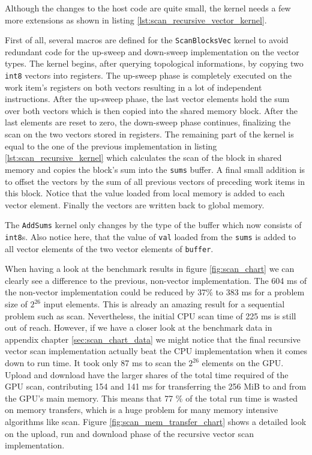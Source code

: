 Although the changes to the host code are quite small, the kernel needs a few more extensions as shown in listing \ref{lst:scan_recursive_vector_kernel}.



First of all, several macros are defined for the \lstinline!ScanBlocksVec! kernel to avoid redundant code for the up-sweep and down-sweep implementation on the vector types. The kernel begins, after querying topological informations, by copying two \lstinline!int8! vectors into registers. The up-sweep phase is completely executed on the work item's registers on both vectors resulting in a lot of independent instructions. After the up-sweep phase, the last vector elements hold the sum over both vectors which is then copied into the shared memory block. After the last elements are reset to zero, the down-sweep phase continues, finalizing the scan on the two vectors stored in registers. The remaining part of the kernel is equal to the one of the previous implementation in listing \ref{lst:scan_recursive_kernel} which calculates the scan of the block in shared memory and copies the block's sum into the \lstinline!sums! buffer. A final small addition is to offset the vectors by the sum of all previous vectors of preceding work items in this block. Notice that the value loaded from local memory is added to each vector element. Finally the vectors are written back to global memory.

The \lstinline!AddSums! kernel only changes by the type of the buffer which now consists of \lstinline!int8!s. Also notice here, that the value of \lstinline!val! loaded from the \lstinline!sums! is added to all vector elements of the two vector elements of \lstinline!buffer!.

When having a look at the benchmark results in figure \ref{fig:scan_chart} we can clearly see a difference to the previous, non-vector implementation. The 604 ms of the non-vector implementation could be reduced by 37\% to 383 ms for a problem size of $2^{26}$ input elements. This is already an amazing result for a sequential problem such as scan. Nevertheless, the initial CPU scan time of 225 ms is still out of reach.
However, if we have a closer look at the benchmark data in appendix chapter \ref{sec:scan_chart_data} we might notice that the final recursive vector scan implementation actually beat the CPU implementation when it comes down to run time. It took only 87 ms to scan the $2^{26}$ elements on the GPU. Upload and download have the larger shares of the total time required of the GPU scan, contributing 154 and 141 ms for transferring the 256 MiB to and from the GPU's main memory. This means that 77 \% of the total run time is wasted on memory transfers, which is a huge problem for many memory intensive algorithms like scan. Figure \ref{fig:scan_mem_transfer_chart} shows a detailed look on the upload, run and download phase of the recursive vector scan implementation.

